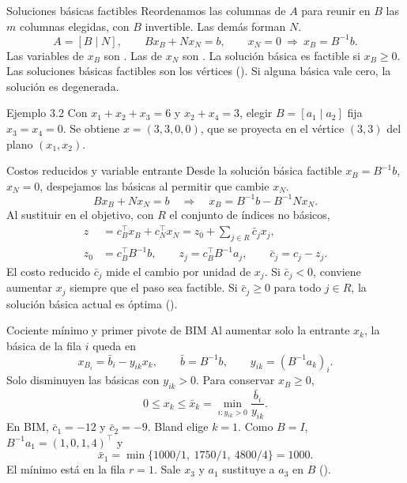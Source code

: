 \documentclass[aspectratio=169,12pt]{beamer}
\begin{document}
\begin{frame}{Soluciones básicas factibles}
Reordenamos las columnas de $A$ para reunir en $B$ las $m$ columnas
elegidas, con $B$ invertible. Las demás forman $N$.
\[
 A=[B\mid N],\qquad Bx_B+Nx_N=b,\qquad
 x_N=0\ \Longrightarrow\ x_B=B^{-1}b .
\]
Las variables de $x_B$ son . Las de $x_N$ son
. La solución básica es factible si $x_B\ge0$.
Las soluciones básicas factibles son los vértices
(\hyperlink{teoria-sbf}{}).
Si alguna básica vale cero, la solución es degenerada.
\begin{block}{Ejemplo 3.2}
Con $x_1+x_2+x_3=6$ y $x_2+x_4=3$, elegir $B=[a_1\mid a_2]$
fija $x_3=x_4=0$. Se obtiene $x=(3,3,0,0)$, que se proyecta en el
vértice $(3,3)$ del plano $(x_1,x_2)$.
\end{block}
\end{frame}

\begin{frame}{Costos reducidos y variable entrante}
Desde la solución básica factible $x_B=B^{-1}b$, $x_N=0$,
despejamos las básicas al permitir que cambie $x_N$.
\[
 Bx_B+Nx_N=b
 \quad\Longrightarrow\quad x_B=B^{-1}b-B^{-1}Nx_N .
\]
Al sustituir en el objetivo, con $R$ el conjunto de índices no básicos,
\[
\begin{aligned}
 z&=c_B^\top x_B+c_N^\top x_N
   =z_0+\sum_{j\in R}\bar c_jx_j,\\
 z_0&=c_B^\top B^{-1}b,\qquad
 z_j=c_B^\top B^{-1}a_j,\qquad \boxed{\bar c_j=c_j-z_j}.
\end{aligned}
\]
El costo reducido $\bar c_j$ mide el cambio por unidad de $x_j$.
Si $\bar c_j<0$, conviene aumentar $x_j$ siempre que el paso sea factible.
Si $\bar c_j\ge0$ para todo $j\in R$, la solución básica actual es óptima
(\hyperlink{teoria-certificados}{}).
\end{frame}

\begin{frame}{Cociente mínimo y primer pivote de BIM}
Al aumentar solo la entrante $x_k$, la básica de la fila $i$ queda en
\[
 x_{B_i}=\bar b_i-y_{ik}x_k,\qquad \bar b=B^{-1}b,\qquad
 y_{ik}=(B^{-1}a_k)_i.
\]
Solo disminuyen las básicas con $y_{ik}>0$. Para conservar $x_B\ge0$,
\[
 0\le x_k\le \bar x_k=\min_{i:y_{ik}>0}\frac{\bar b_i}{y_{ik}} .
\]
En BIM, $\bar c_1=-12$ y $\bar c_2=-9$. Bland elige $k=1$.
Como $B=I$, $B^{-1}a_1=(1,0,1,4)^\top$ y
\[
 \bar x_1=\min\{1000/1,\ 1750/1,\ 4800/4\}=1000 .
\]
El mínimo está en la fila $r=1$. Sale $x_3$ y $a_1$ sustituye a $a_3$ en $B$
(\hyperlink{teoria-pivote}{}).
\end{frame}
\end{document}
